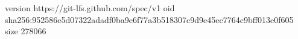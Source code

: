 version https://git-lfs.github.com/spec/v1
oid sha256:952586e5d07322adadf0ba9e6f77a3b518307c9d9e45ec7764c9bff013e0f605
size 278066
